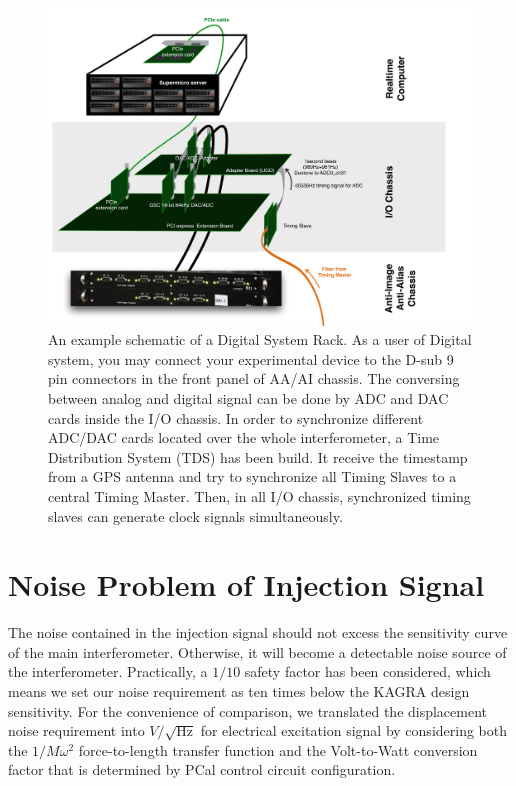 \begin{figure}[hbt!]
\centering
\includegraphics[width=1\textwidth]{figure/dgs}
\caption[An example schematic of a Digital System Rack]{ An example schematic of a Digital System Rack. As a user of Digital system, you may connect your experimental device to the D-sub 9 pin connectors in the front panel of AA/AI chassis. The conversing between analog and digital signal can be done by ADC and DAC cards inside the I/O chassis. In order to synchronize different ADC/DAC cards located over the whole interferometer, a Time Distribution System (TDS) has been build. It receive the timestamp from a GPS antenna and try to synchronize all Timing Slaves to a central Timing Master. Then, in all I/O chassis, synchronized timing slaves can generate clock signals simultaneously.  }
\label{fig:dgs}
\end{figure}



\clearpage
\section{Noise Problem of Injection Signal}

The noise contained in the injection signal should not excess the sensitivity curve of the main interferometer. Otherwise, it will become a detectable noise source of the interferometer. Practically, a $1/10$ safety factor has been considered, which means we set our noise requirement as ten times below the KAGRA design sensitivity\cite{kagra:sn}. For the convenience of comparison, we translated the displacement noise requirement into $V/\sqrt{\mathrm{Hz}}$ for electrical excitation signal by considering both the $1/M\omega^2$ force-to-length transfer function and the Volt-to-Watt conversion factor that is determined by PCal control circuit configuration.



